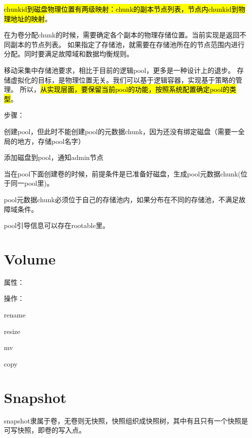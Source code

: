 \hl{chunkid到磁盘物理位置有两级映射：chunk的副本节点列表，节点内chunkid到物理地址的映射}。

在为卷分配chunk的时候，需要确定各个副本的物理存储位置。当前实现是返回不同副本的节点列表。
如果指定了存储池，就需要在存储池所在的节点范围内进行分配。同时要满足故障域和数据均衡规则。

\begin{tcolorbox}
移动采集中存储池要求，相比于目前的逻辑pool，更多是一种设计上的退步。
存储虚拟化的目标，是物理位置无关。我们可以基于逻辑容器，实现基于策略的管理。
所以，\hl{从实现层面，要保留当前pool的功能，按照系统配置确定pool的类型}。
\end{tcolorbox}


步骤：
\begin{enumbox}
\item 创建pool，但此时不能创建pool的元数据chunk，因为还没有绑定磁盘（需要一全局的地方，存储pool名字）
\item 添加磁盘到pool，通知admin节点
\item 当在pool下面创建卷的时候，前提条件是已准备好磁盘，生成pool元数据chunk(位于同一pool里)。
\end{enumbox}

pool元数据chunk必须位于自己的存储池内，如果分布在不同的存储池，不满足故障域条件。

pool引导信息可以存在rootable里。

\section{Volume}

属性：

操作：
\begin{compactenum}
    \item rename
    \item resize 
    \item mv
    \item copy   %
\end{compactenum}

\section{Snapshot}

snapshot隶属于卷，无卷则无快照，快照组织成快照树，其中有且只有一个快照是可写快照，即卷的写入点。

